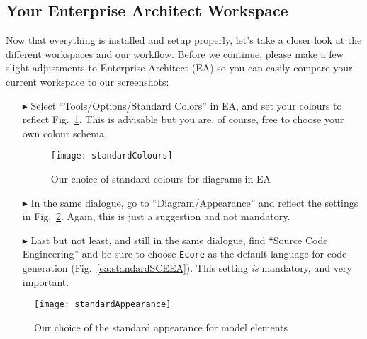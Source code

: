 \visHeader

\subsection{Your Enterprise Architect Workspace}

Now\hypertarget{projectStructure vis}{} that everything is installed and setup properly, let's take a closer look at the different workspaces and our workflow.
Before we continue, please make a few slight adjustments to Enterprise Architect (EA) so you can easily compare your current workspace to our screenshots:
\begin{itemize}

\item[$\blacktriangleright$] Select ``Tools/Options/Standard Colors'' in EA, and set your colours to reflect Fig.~\ref{ea:standardColoursEA}.
This is advisable but you are, of course, free to choose your own colour schema.

\vspace{0.5cm}

\begin{figure}[htbp]
  \centering
  \texttt{[image: standardColours]}
  \caption{Our choice of standard colours for diagrams in EA}
  \label{ea:standardColoursEA}
\end{figure}

\vspace{0.5cm}

\item[$\blacktriangleright$] In the same dialogue, go to ``Diagram/Appearance'' and reflect the settings in Fig.~\ref{ea:standardAppearanceEA}.
Again, this is just a suggestion and not mandatory.

\vspace{0.5cm}

\item[$\blacktriangleright$] Last but not least, and still in the same dialogue, find ``Source Code Engineering'' and be sure to choose \texttt{Ecore} as the
default language for code generation (Fig.~\ref{ea:standardSCEEA}). This setting \emph{is} mandatory, and very important.
\end{itemize}

\begin{figure}[htbp]
  \centering
  \texttt{[image: standardAppearance]}
  \caption{Our choice of the standard appearance for model elements}
  \label{ea:standardAppearanceEA}
\end{figure}

